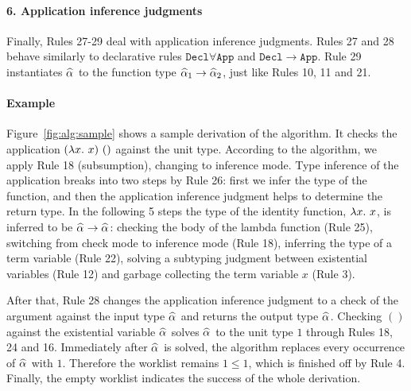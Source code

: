 \paragraph{\bf 6. Application inference judgments}
Finally, Rules 27-29 deal with application inference judgments.
Rules 27 and 28 behave similarly to declarative rules $\mathtt{Decl\forall App}$ and $\mathtt{Decl\to App}$.
Rule 29 instantiates $\al$ to the function type $\al[1] \to \al[2]$, just like Rules 10, 11 and 21.

\paragraph{Example}
Figure~\ref{fig:alg:sample} shows a sample derivation of the algorithm.
It checks the application $(\lam x)~()$ against the unit type.
According to the algorithm, we apply Rule 18 (subsumption), changing to inference mode.
Type inference of the application breaks into two steps by Rule 26:
first we infer the type of the function,
and then the application inference judgment helps to determine the return type.
In the following 5 steps the type of the identity function, $\lam x$, is inferred to be $\al \to \al$:
checking the body of the lambda function (Rule 25),
switching from check mode to inference mode (Rule 18),
inferring the type of a term variable (Rule 22),
solving a subtyping judgment between existential variables (Rule 12) and
garbage collecting the term variable $x$ (Rule 3).

After that, Rule 28 changes the application inference judgment to
a check of the argument against the input type $\al$ and returns the output type $\al$.
Checking $()$ against the existential variable $\al$ solves $\al$ to the unit type $1$
through Rules 18, 24 and 16.
Immediately after $\al$ is solved, the algorithm replaces every occurrence of $\al$ with $1$.
Therefore the worklist remains $1 \le 1$, which is finished off by Rule 4.
Finally, the empty worklist indicates the success of the whole derivation.

